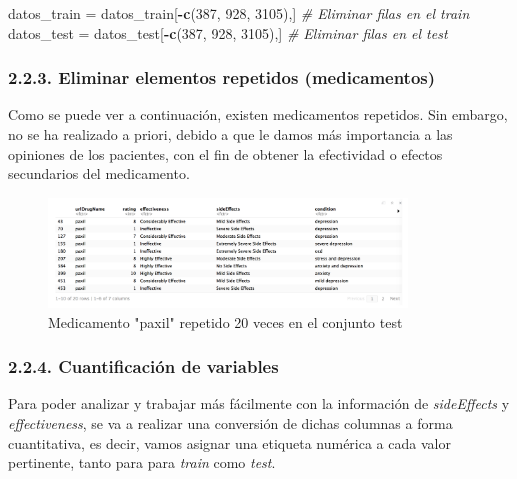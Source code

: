 \documentclass[spanish,]{article}
\newenvironment{Shaded}{\begin{snugshade}}{\end{snugshade}}
\newcommand{\KeywordTok}[1]{\textcolor[rgb]{0.13,0.29,0.53}{\textbf{#1}}}
\newcommand{\DecValTok}[1]{\textcolor[rgb]{0.00,0.00,0.81}{#1}}
\newcommand{\StringTok}[1]{\textcolor[rgb]{0.31,0.60,0.02}{#1}}
\newcommand{\CommentTok}[1]{\textcolor[rgb]{0.56,0.35,0.01}{\textit{#1}}}
\newcommand{\OperatorTok}[1]{\textcolor[rgb]{0.81,0.36,0.00}{\textbf{#1}}}
\newcommand{\NormalTok}[1]{#1}
\begin{document}
\begin{Shaded}
\begin{Highlighting}[]
\NormalTok{datos_train =}\StringTok{ }\NormalTok{datos_train[}\OperatorTok{-}\KeywordTok{c}\NormalTok{(}\DecValTok{387}\NormalTok{, }\DecValTok{928}\NormalTok{, }\DecValTok{3105}\NormalTok{),] }\CommentTok{# Eliminar filas en el train}
\NormalTok{datos_test =}\StringTok{ }\NormalTok{datos_test[}\OperatorTok{-}\KeywordTok{c}\NormalTok{(}\DecValTok{387}\NormalTok{, }\DecValTok{928}\NormalTok{, }\DecValTok{3105}\NormalTok{),] }\CommentTok{# Eliminar filas en el test}
\end{Highlighting}
\end{Shaded}

\subsubsection{2.2.3. Eliminar elementos repetidos
(medicamentos)}\label{eliminar-elementos-repetidos-medicamentos}

Como se puede ver a continuación, existen medicamentos repetidos. Sin
embargo, no se ha realizado a priori, debido a que le damos más
importancia a las opiniones de los pacientes, con el fin de obtener la
efectividad o efectos secundarios del medicamento.

\begin{figure}[h]
    \centering
    \includegraphics[width=0.85\textwidth]{imagenes/medicamentos_duplicados.png}
    \caption{Medicamento "paxil" repetido 20 veces en el conjunto test}
    \label{medicamentos_repetidos}
\end{figure}

\subsubsection{2.2.4. Cuantificación de
variables}\label{cuantificacion-de-variables}

Para poder analizar y trabajar más fácilmente con la información de
\emph{sideEffects} y \emph{effectiveness}, se va a realizar una
conversión de dichas columnas a forma cuantitativa, es decir, vamos
asignar una etiqueta numérica a cada valor pertinente, tanto para para
\emph{train} como \emph{test}.
\end{document}
